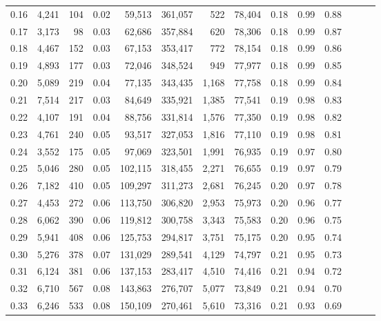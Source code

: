 \begin{tabular}{rrrrrrrrrrrrrr}
0.16 &   4,241 &    104 &  0.02 &   59,513 &  361,057 &     522 &  78,404 &  0.18 &  0.99 &      0.88 \\
0.17 &   3,173 &     98 &  0.03 &   62,686 &  357,884 &     620 &  78,306 &  0.18 &  0.99 &      0.87 \\
0.18 &   4,467 &    152 &  0.03 &   67,153 &  353,417 &     772 &  78,154 &  0.18 &  0.99 &      0.86 \\
0.19 &   4,893 &    177 &  0.03 &   72,046 &  348,524 &     949 &  77,977 &  0.18 &  0.99 &      0.85 \\
0.20 &   5,089 &    219 &  0.04 &   77,135 &  343,435 &   1,168 &  77,758 &  0.18 &  0.99 &      0.84 \\
0.21 &   7,514 &    217 &  0.03 &   84,649 &  335,921 &   1,385 &  77,541 &  0.19 &  0.98 &      0.83 \\
0.22 &   4,107 &    191 &  0.04 &   88,756 &  331,814 &   1,576 &  77,350 &  0.19 &  0.98 &      0.82 \\
0.23 &   4,761 &    240 &  0.05 &   93,517 &  327,053 &   1,816 &  77,110 &  0.19 &  0.98 &      0.81 \\
0.24 &   3,552 &    175 &  0.05 &   97,069 &  323,501 &   1,991 &  76,935 &  0.19 &  0.97 &      0.80 \\
0.25 &   5,046 &    280 &  0.05 &  102,115 &  318,455 &   2,271 &  76,655 &  0.19 &  0.97 &      0.79 \\
0.26 &   7,182 &    410 &  0.05 &  109,297 &  311,273 &   2,681 &  76,245 &  0.20 &  0.97 &      0.78 \\
0.27 &   4,453 &    272 &  0.06 &  113,750 &  306,820 &   2,953 &  75,973 &  0.20 &  0.96 &      0.77 \\
0.28 &   6,062 &    390 &  0.06 &  119,812 &  300,758 &   3,343 &  75,583 &  0.20 &  0.96 &      0.75 \\
0.29 &   5,941 &    408 &  0.06 &  125,753 &  294,817 &   3,751 &  75,175 &  0.20 &  0.95 &      0.74 \\
0.30 &   5,276 &    378 &  0.07 &  131,029 &  289,541 &   4,129 &  74,797 &  0.21 &  0.95 &      0.73 \\
0.31 &   6,124 &    381 &  0.06 &  137,153 &  283,417 &   4,510 &  74,416 &  0.21 &  0.94 &      0.72 \\
0.32 &   6,710 &    567 &  0.08 &  143,863 &  276,707 &   5,077 &  73,849 &  0.21 &  0.94 &      0.70 \\
0.33 &   6,246 &    533 &  0.08 &  150,109 &  270,461 &   5,610 &  73,316 &  0.21 &  0.93 &      0.69 \\

\end{tabular}
